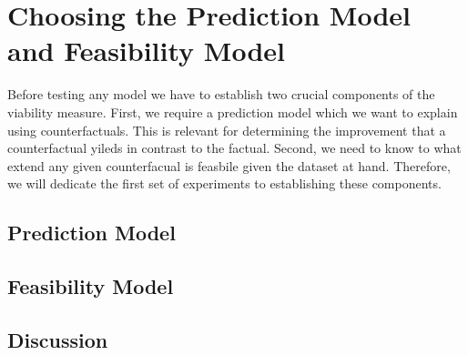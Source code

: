 \documentclass[./../../paper.tex]{subfiles}
\begin{document}
\section{Choosing the Prediction Model and Feasibility Model}
Before testing any model we have to establish two crucial components of the viability measure. First, we require a prediction model which we want to explain using counterfactuals. This is relevant for determining the improvement that a counterfactual yileds in contrast to the factual. Second, we need to know to what extend any given counterfacual is feasbile given the dataset at hand. Therefore, we will dedicate the first set of experiments to establishing these components.

\subsection{Prediction Model}

\subsection{Feasibility Model}

\subsection{Discussion}
 
\end{document}
